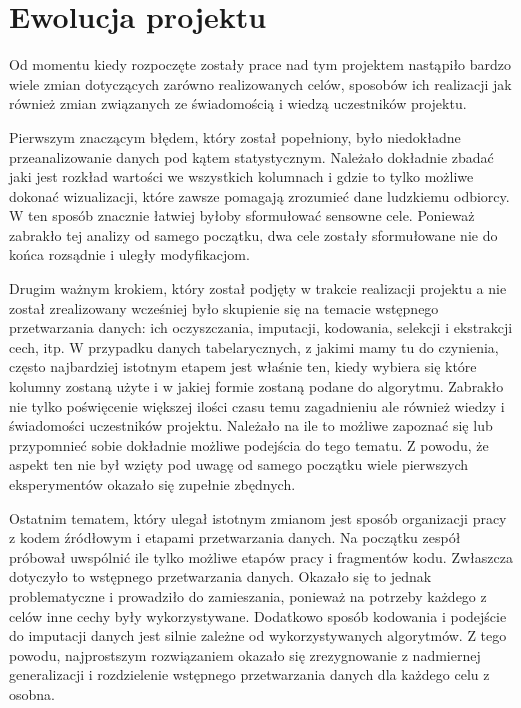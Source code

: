 \documentclass{classrep}
\begin{document}
    \section{Ewolucja projektu} {
        Od momentu kiedy rozpoczęte zostały prace nad tym projektem nastąpiło bardzo wiele zmian dotyczących zarówno realizowanych celów, sposobów ich realizacji jak również zmian związanych ze świadomością i wiedzą uczestników projektu.
        
        Pierwszym znaczącym błędem, który został popełniony, było niedokładne przeanalizowanie danych pod kątem statystycznym. Należało dokładnie zbadać jaki jest rozkład wartości we wszystkich kolumnach i gdzie to tylko możliwe dokonać wizualizacji, które zawsze pomagają zrozumieć dane ludzkiemu odbiorcy. W ten sposób znacznie łatwiej byłoby sformułować sensowne cele. Ponieważ zabrakło tej analizy od samego początku, dwa cele zostały sformułowane nie do końca rozsądnie i uległy modyfikacjom.
        
        Drugim ważnym krokiem, który został podjęty w trakcie realizacji projektu a nie został zrealizowany wcześniej było skupienie się na temacie wstępnego przetwarzania danych: ich oczyszczania, imputacji, kodowania, selekcji i ekstrakcji cech, itp. W przypadku danych tabelarycznych, z jakimi mamy tu do czynienia, często najbardziej istotnym etapem jest właśnie ten, kiedy wybiera się które kolumny zostaną użyte i w jakiej formie zostaną podane do algorytmu. Zabrakło nie tylko poświęcenie większej ilości czasu temu zagadnieniu ale również wiedzy i świadomości uczestników projektu. Należało na ile to możliwe zapoznać się lub przypomnieć sobie dokładnie możliwe podejścia do tego tematu. Z powodu, że aspekt ten nie był wzięty pod uwagę od samego początku wiele pierwszych eksperymentów okazało się zupełnie zbędnych.
        
        Ostatnim tematem, który ulegał istotnym zmianom jest sposób organizacji pracy z kodem źródłowym i etapami przetwarzania danych. Na początku zespół próbował uwspólnić ile tylko możliwe etapów pracy i fragmentów kodu. Zwłaszcza dotyczyło to wstępnego przetwarzania danych. Okazało się to jednak problematyczne i prowadziło do zamieszania, ponieważ na potrzeby każdego z celów inne cechy były wykorzystywane. Dodatkowo sposób kodowania i podejście do imputacji danych jest silnie zależne od wykorzystywanych algorytmów. Z tego powodu, najprostszym rozwiązaniem okazało się zrezygnowanie z nadmiernej generalizacji i rozdzielenie wstępnego przetwarzania danych dla każdego celu z osobna.
    }
\end{document}
